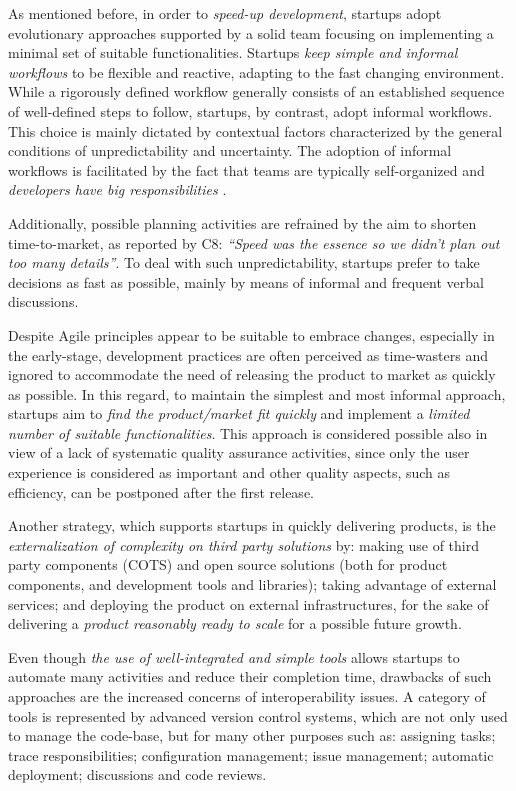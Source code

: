 \documentclass[10pt,journal,letterpaper,compsoc]{IEEEtran}
\begin{document}
As mentioned before, in order to \textit{speed-up development}, startups adopt 
evolutionary approaches supported by a solid team focusing on implementing a 
minimal set of suitable functionalities. Startups \textit{keep simple and 
informal workflows} to be flexible and reactive, adapting to the fast changing 
environment. While a rigorously defined workflow generally consists of an 
established sequence of well-defined steps to follow, startups, by contrast, 
adopt informal workflows. This choice is mainly dictated by contextual factors 
characterized by the general conditions of unpredictability and uncertainty. The 
adoption of informal workflows is facilitated by the fact that teams are 
typically self-organized and \textit{developers have big responsibilities} .

Additionally, possible planning activities are refrained by the aim to shorten 
time-to-market, as reported by C8: \textit{``Speed was the essence so we didn't 
plan out too many details''}. To deal with such unpredictability, startups 
prefer to take decisions as fast as possible, mainly by means of informal and 
frequent verbal discussions.

Despite Agile principles appear to be suitable to embrace changes, especially 
in the early-stage, development practices are often perceived as time-wasters 
and ignored to accommodate the need of releasing the product to market as 
quickly as possible. In this regard, to maintain the simplest and most informal 
approach, startups aim to \textit{find the product/market fit quickly} and 
implement a \textit{limited number of suitable functionalities}. This approach 
is considered possible also in view of a lack of systematic quality assurance 
activities, since only the user experience is considered as important and other 
quality aspects, such as efficiency, can be postponed after the first release.  

Another strategy, which supports startups in quickly delivering products, is 
the \textit{externalization of complexity on third party solutions} by: making 
use of third party components (COTS) and open source solutions (both for 
product components, and development tools and libraries); taking advantage of  
external services; and deploying the product on external infrastructures, for 
the sake of delivering a \textit{product reasonably ready to scale} for a 
possible future growth.

Even though \textit{the use of well-integrated and simple tools} allows 
startups to automate many activities and reduce their completion time, drawbacks 
of such approaches are the increased concerns of interoperability issues. A 
category of tools is represented by advanced version control systems, which are 
not only used to manage the code-base, but for many other purposes such as: 
assigning tasks; trace responsibilities; configuration management; issue 
management; automatic deployment; discussions and code reviews.
\end{document}
